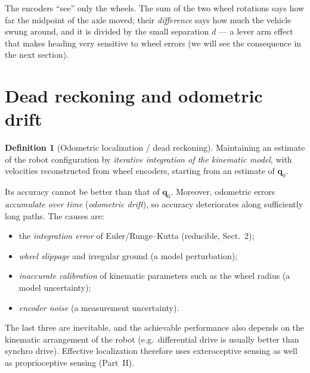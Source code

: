 \documentclass[11pt,a4paper]{article}
\newcommand{\bq}{\boldsymbol{q}}
\newcommand{\slides}[1]{\texorpdfstring{\hspace{0.5em}{\normalfont\small\emph{(#1)}}}{}}
\theoremstyle{plain}
\theoremstyle{definition}
\newtheorem{definition}[theorem]{Definition}
\theoremstyle{remark}
\begin{document}
\begin{intuition}
The encoders ``see'' only the wheels. The sum of the two wheel rotations says how far the midpoint of the
axle moved; their \emph{difference} says how much the vehicle swung around, and it is divided by the small
separation $d$ --- a lever arm effect that makes heading very sensitive to wheel errors (we will see the
consequence in the next section).
\end{intuition}

\section{Dead reckoning and odometric drift \slides{odometry deck, slides 8--9}}

\begin{definition}[Odometric localization / dead reckoning]
Maintaining an estimate of the robot configuration by \emph{iterative integration of the kinematic model},
with velocities reconstructed from wheel encoders, starting from an estimate of $\bq_0$.
\end{definition}

Its accuracy cannot be better than that of $\bq_0$. Moreover, odometric errors \emph{accumulate over time}
(\emph{odometric drift}), so accuracy deteriorates along sufficiently long paths. The causes are:
\begin{itemize}
\item the \emph{integration error} of Euler/Runge--Kutta (reducible, Sect.~2);
\item \emph{wheel slippage} and irregular ground (a model perturbation);
\item \emph{inaccurate calibration} of kinematic parameters such as the wheel radius (a model uncertainty);
\item \emph{encoder noise} (a measurement uncertainty).
\end{itemize}
The last three are inevitable, and the achievable performance also depends on the kinematic arrangement of the
robot (e.g.\ differential drive is usually better than synchro drive). Effective localization therefore uses
exteroceptive sensing as well as proprioceptive sensing (Part~II).
\end{document}
